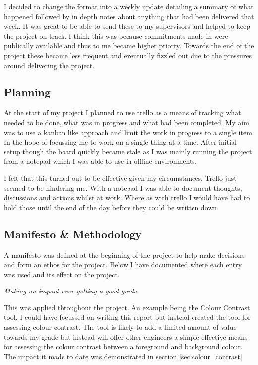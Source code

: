 I decided to change the format into a weekly update
detailing a summary of what happened followed by in depth notes about
anything that had been delivered that week. It was great to be able to send
these to my supervisors and helped to keep the project on track. I
think this was because commitments
made in were publically available and thus to me became higher priorty. Towards
the end of the project these became less frequent and eventually fizzled out
due to the pressures around delivering the project.

\subsection{Planning}
At the start of my project I planned to use trello as a means of tracking what
needed to be done, what was in progress and what had been completed. My aim was
to use a kanban like approach and limit the work in progress to a single item.
In the hope of focussing me to work on a single thing at a time. After
initial setup though the board quickly became stale as I was mainly running
the project from a notepad which I was able to use in offline environments.

I felt that this turned out to be effective given my circumstances. Trello
just seemed to be hindering me. With a notepad I was able to
document thoughts, discussions and actions whilst at work. Where as with
trello I would have had to hold those until the end of the day before they
could be written down.

\subsection{Manifesto \& Methodology}
A manifesto was defined at the beginning of the project to help make
decisions and form an ethos for the project. Below I have documented where
each entry was used and its effect on the project.

\begin{center}
\textit{Making an impact over getting a good grade}
\end{center}
This was applied throughout the project. An example being the Colour Contrast
tool. I could have focussed on writing this report but instead created the
tool for assessing colour contrast. The tool is likely to add a limited amount
of value towards my grade but instead will offer other engineers a simple
effective means for assessing the colour contrast between a foreground and
background colour. The impact it made to date was demonstrated in
section \ref{sec:colour_contrast}

